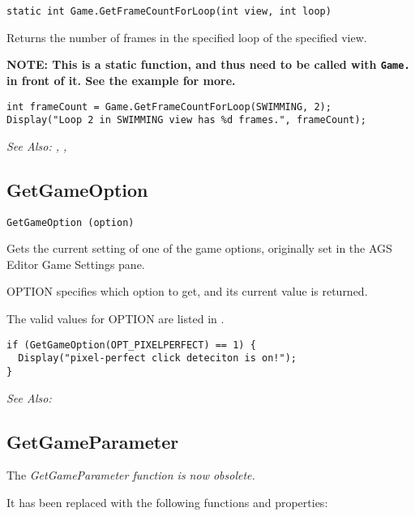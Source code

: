 \begin{verbatim}
static int Game.GetFrameCountForLoop(int view, int loop)
\end{verbatim}
Returns the number of frames in the specified loop of the specified view.

\bf{NOTE:} This is a static function, and thus need to be called with \verb$Game.$ in front of it. See
the example for more.

\begin{verbatim}
int frameCount = Game.GetFrameCountForLoop(SWIMMING, 2);
Display("Loop 2 in SWIMMING view has %d frames.", frameCount);
\end{verbatim}

\it{See Also:} ,
,


\subsection{GetGameOption}\label{GetGameOption}%

\begin{verbatim}
GetGameOption (option)
\end{verbatim}

Gets the current setting of one of the game options, originally set in the AGS Editor
Game Settings pane.

OPTION specifies which option to get, and its current value is returned.

The valid values for OPTION are listed in .

\begin{verbatim}
if (GetGameOption(OPT_PIXELPERFECT) == 1) {
  Display("pixel-perfect click deteciton is on!");
}
\end{verbatim}

\it{See Also:} 



\subsection{GetGameParameter}\label{GetGameParameter}%

The \it{GetGameParameter} function is now obsolete.

It has been replaced with the following functions and properties:

